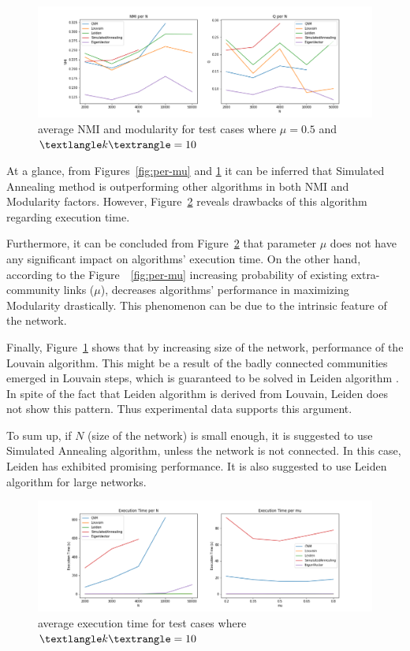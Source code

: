 \documentclass[11pt,a4paper]{article}
\begin{document}
\begin{figure}[H]
	\includegraphics[width=\linewidth]{per-n.png}
	\caption{average NMI and modularity for test cases where $\mu = 0.5$ and $\textlangle k \textrangle = 10$}
	\label{fig:per-n}
\end{figure}

At a glance, from Figures~\ref{fig:per-mu} and \ref{fig:per-n} it can be inferred that Simulated Annealing method is outperforming other algorithms in both NMI and Modularity factors. However, Figure~\ref{fig:exec-time} reveals drawbacks of this algorithm regarding execution time. 

Furthermore, it can be concluded from Figure~\ref{fig:exec-time} that parameter $\mu$ does not have any significant impact on algorithms' execution time. On the other hand, according to the Figure~~\ref{fig:per-mu} increasing probability of existing extra-community links ($\mu$), decreases algorithms' performance in maximizing Modularity drastically. This phenomenon can be due to the intrinsic feature of the network.

Finally, Figure~\ref{fig:per-n} shows that by increasing size of the network, performance of the Louvain algorithm. This might be a result of the badly connected communities emerged in Louvain steps, which is guaranteed to be solved in Leiden algorithm \cite{leiden}. In spite of the fact that Leiden algorithm is derived from Louvain, Leiden does not show this pattern. Thus experimental data supports this argument.

To sum up, if $N$ (size of the network) is small enough, it is suggested to use Simulated Annealing algorithm, unless the network is not connected. In this case, Leiden has exhibited promising performance. It is also suggested to use Leiden algorithm for large networks.

\begin{figure}[H]
	\includegraphics[width=\linewidth]{exec_time.png}
	\caption{average execution time for test cases where $\textlangle k \textrangle = 10$}
	\label{fig:exec-time}
\end{figure}
\end{document}
